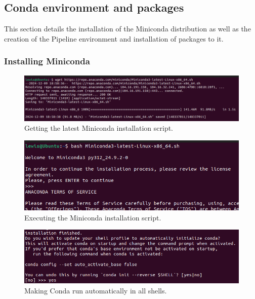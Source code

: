 \documentclass[12pt]{report}
\begin{document}

\subsection{Conda environment and packages}
This section details the installation of the Miniconda distribution as well as the creation of 
the Pipeline environment and installation of packages to it.

\subsubsection{Installing Miniconda}

\begin{figure}[H]
    \centering
    \includegraphics[width=.75\linewidth]{Implementation/Conda/Installation/1.png}
    \caption{Getting the latest Miniconda installation script.}
    \label{fig:CondaInstall1}
\end{figure}

\begin{figure}[H]
    \centering
    \includegraphics[width=.75\linewidth]{Implementation/Conda/Installation/2.png}
    \caption{Executing the Miniconda installation script.}
    \label{fig:CondaInstall2}
\end{figure}


\begin{figure}[H]
    \centering
    \includegraphics[width=.75\linewidth]{Implementation/Conda/Installation/4.png}
    \caption{Making Conda run automatically in all shells.}
    \label{fig:CondaInstall4}
\end{figure}
\end{document}
